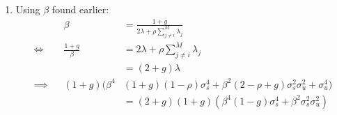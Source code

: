\documentclass{scrartcl}
\newcommand{\rb}[1]{\ensuremath{\left(#1\right)}}
\newcommand{\sqb}[1]{\ensuremath{\left[#1\right]}}
\def\exp{\mathbb{E}}
\def\chil{\ensuremath{\rho}}
\begin{document}
\begin{enumerate}
\begin{align*}
\begin{bmatrix}
																	- \beta^2 \sigma_{ss} & \beta^2 \sigma_s^2 + \sigma_u^2 & \ldots \\
																	\ldots & \ldots & \ldots
																\end{bmatrix}\\[.7em]
					\implies&&	\lambda_i			&=  \frac{\beta (\sigma_s^2 + (M-1)\sigma_{ss} )\rb{ \beta^2( \sigma_s^2 - (M-1) \sigma_{ss} ) + \sigma_u^2 }
															}{\rb{\beta^2 (\sigma_s^2 - \sigma_{ss}) + \sigma_u^2}\rb{ \beta^2 (\sigma_s^2 + (M-1)\sigma_{ss}) + \sigma_u^2 }}\\[.7em]
							&&						&= 	\frac{\beta (1 + (M-1)\chil )\sigma_s^2\rb{ \beta^2( 1 - (M-1) \chil )\sigma_s^2 + \sigma_u^2 }
															}{\rb{\beta^2 (1 - \chil)\sigma_s^2 + \sigma_u^2}\rb{ \beta^2 (1 + (M-1)\chil)\sigma_s^2 + \sigma_u^2 }}\\[.7em]
											&&      &=	\frac{\beta^3 (1 + (M-1)\chil )( 1 - (M-1) \chil )\sigma_s^4 + \beta (1 + (M-1)\chil ) \sigma_s^2\sigma_u^2
															}{\beta^4 (1 - \chil)(1 + (M-1)\chil)\sigma_s^4 + \beta^2 \rb{ 2 + (M-2)\chil } \sigma_s^2 \sigma_u^2 + \sigma_u^4 }																										
				\end{align*}
				Denote $g:= (M - 1)\chil $, measuring total explanatory power of $j\neq i$ signals over $i$th signal, and recall the second order condition $\lambda > 0 $:
				\begin{align*}
					\Aboxed{\lambda_i			&= \frac{(1 + g )\sqb{\beta^3 ( 1 - g )\sigma_s^4 + \beta \sigma_s^2\sigma_u^2}
																		}{\beta^4 (1 + g)(1 - \chil)\sigma_s^4 + \beta^2 \rb{ 2 - \chil + g } \sigma_s^2 \sigma_u^2 + \sigma_u^4 } > 0}
				\end{align*}
				which implies $\beta > 0 $. Finally, $ \delta = \exp[ v - \lambda \sum_{i=1}^M y_i ] = \mu - \lambda (M \alpha + \beta \mu) $.
				\item Using $\beta$ found earlier:
				\begin{align*}
					&& 				\beta       						&= \frac{1 + g}{2 \lambda + \chil \sum_{j\neq i}^M \lambda_j}\\[.7em]
					\iff &&			\frac{1 + g}{\beta}					&= 2 \lambda + \chil \sum_{j\neq i}^M \lambda_j\\[.5em]
					&&													&= (2 + g )\lambda \\[.5em]
					\implies&&		(1 + g)(\beta^4 &(1 + g)(1 - \chil)\sigma_s^4 + \beta^2 \rb{ 2 - \chil + g } \sigma_s^2 \sigma_u^2 + \sigma_u^4) \\[.5em]
							&&											&= (2 + g) (1 + g) ( \beta^4 ( 1 - g )\sigma_s^4 + \beta^2 \sigma_s^2\sigma_u^2 )\\[.5em]

\end{align*}
\end{enumerate}
\end{document}
